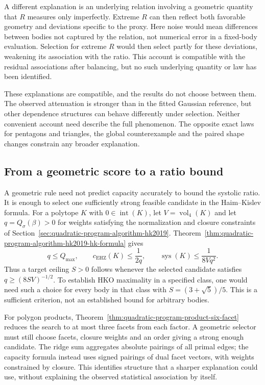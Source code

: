A different explanation is an underlying relation involving a geometric
quantity that $R$ measures only imperfectly. Extreme $R$ can then reflect
both favorable geometry and deviations specific to the proxy. Here noise
would mean differences between bodies not captured by the relation, not
numerical error in a fixed-body evaluation. Selection for extreme $R$ would then select partly for these deviations,
weakening its association with the ratio. This account is compatible with
the residual associations after balancing, but no such underlying
quantity or law has been identified.

These explanations are compatible, and the results do not choose between
them. The observed attenuation is stronger than in the fitted Gaussian
reference, but other dependence structures can behave differently under
selection. Neither convenient account need describe the full phenomenon.
The opposite exact laws for pentagons and triangles, the global
counterexample and the paired shape changes constrain any broader
explanation.

\subsection{From a geometric score to a ratio bound}
\label{subsec:ds-geometric-witness}

A geometric rule need not predict capacity accurately to bound the systolic
ratio. It is enough to select one sufficiently strong feasible candidate in
the Haim--Kislev formula. For a polytope $K$ with
$0\in\operatorname{int}(K)$, let $V=\operatorname{vol}_4(K)$ and let
$q=Q_\sigma(\beta)>0$ for weights satisfying the normalization and closure
constraints of Section~\ref{sec:quadratic-program-algorithm-hk2019}.
Theorem~\ref{thm:quadratic-program-algorithm-hk2019-hk-formula} gives
\[
 q\leq Q_{\max},\qquad
 c_{\mathrm{EHZ}}(K)\leq\frac1{2q},\qquad
 \operatorname{sys}(K)\leq\frac1{8Vq^2}.
\]
Thus a target ceiling $S>0$ follows whenever the selected candidate satisfies
$q\geq(8SV)^{-1/2}$. To establish HKO maximality in a specified class,
one would need such a choice for every body in that class with
$S=(3+\sqrt5)/5$. This is a sufficient criterion, not an established
bound for arbitrary bodies.

For polygon products, Theorem~\ref{thm:quadratic-program-product-six-facet}
reduces the search to at most three facets from each factor. A geometric selector
must still choose facets, closure weights and an order giving a strong
enough candidate. The ridge sum aggregates absolute pairings of all primal
edges; the capacity formula instead uses signed pairings of dual facet
vectors, with weights constrained by closure. This identifies structure
that a sharper explanation could use, without explaining the observed
statistical association by itself.

